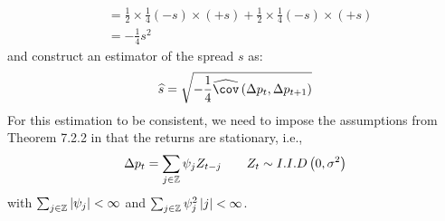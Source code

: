 \begin{solution}
\begin{align*}
        & = \frac{1}{2}\times\frac{1}{4}(-s)\times(+s) + \frac{1}{2}\times\frac{1}{4}(-s)\times(+s) \\ 
        & = -\frac{1}{4}s^2
    \end{align*}
    and construct an estimator of the spread \(s\) as:
    \[
        \wh{s} = \sqrt{-\frac{1}{4}\wh\cov\left(\Delta p_{t},\Delta p_{t+1}\right)}
    \]
    For this estimation to be consistent, we need to impose the assumptions from Theorem 7.2.2 in \citet{brockwell2009time} that the returns are stationary, i.e., 
    \[
        \Delta p_{t} = \sum_{j \in \mathbb{Z}} \psi_j Z_{t-j} \qquad Z_t \sim I.I.D \left( 0, \sigma^2 \right)
    \]
    with \(\sum_{j \in \mathbb{Z}} |\psi_j| < \infty\) and \(\sum_{j \in \mathbb{Z}} \psi_j^2\left\lvert j \right\rvert < \infty\).
\end{solution}
